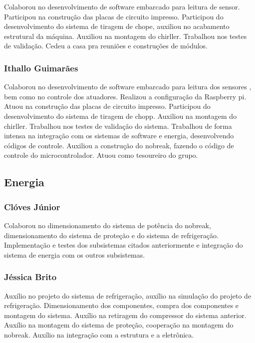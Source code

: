 \begin{apendicesenv}
Colaborou no desenvolvimento de software embarcado para leitura de sensor. 
Participou na construção das placas de circuito impresso. 
Participou do desenvolvimento do sistema de tiragem de chope, 
auxiliou no acabamento estrutural da máquina. Auxiliou na montagem do chirller. 
Trabalhou nos testes de validação. Cedeu a casa pra reuniões e construções de módulos.

\subsubsection{Ithallo Guimarães}

Colaborou no desenvolvimento de software embarcado para leitura dos sensores , bem como no controle dos atuadores.  
Realizou a configuração da Raspberry pi. Atuou na construção das placas de circuito impresso. 
Participou do desenvolvimento do sistema de tiragem de chopp. 
Auxiliou na montagem do chirller. 
Trabalhou nos testes de validação do sistema.
Trabalhou de forma intensa na integração com os sistemas de software e energia, desenvolvendo códigos de controle.
Auxiliou a construção do nobreak, fazendo o código de controle do microcontrolador.
Atuou como tesoureiro do grupo.

\subsection{Energia}

\subsubsection{Clóves Júnior}

Colaborou no dimensionamento do sistema de potência do nobreak, dimensionamento do sistema de proteção e
do sistema de refrigeração. Implementação e testes dos subsistemas citados anteriormente e integração do
sistema de energia com os outros subsistemas.

\subsubsection{Jéssica Brito}

Auxílio no projeto do sistema de refrigeração,
auxílio na simulação do projeto de refrigeração. 
Dimensionamento dos componentes, compra dos componentes e montagem do sistema. 
Auxílio na retiragem do compressor do sistema anterior. 
Auxílio na montagem do sistema de proteção, cooperação na montagem do nobreak.
Auxílio na integração com a estrutura e a eletrônica.


\end{apendicesenv}

